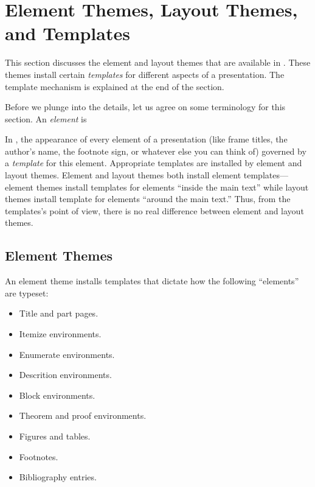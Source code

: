 
%


\section{Element Themes, Layout Themes, and Templates}

This section discusses the element and layout themes that are
available in \beamer. These themes install certain \emph{templates}
for different aspects of a presentation. The template mechanism is
explained at the end of the section.

Before we plunge into the details, let us agree on some terminology
for this section. An \emph{element} is 

In \beamer, the appearance of every element of a presentation (like
frame titles, the author's name, the footnote sign, or whatever else
you can think of) governed by a \emph{template} for this
element. Appropriate templates are installed by element and layout
themes. Element and layout themes both install element
templates---element themes install templates for elements
``inside the main text'' while layout themes install template for
elements ``around the main text.'' Thus, from the templates's point of
view, there is no real difference between element and layout themes.



\subsection{Element Themes}

An element theme installs templates that dictate how the following
``elements'' are typeset:
\begin{itemize}
\item Title and part pages.
\item Itemize environments.
\item Enumerate environments.
\item Descrition environments.
\item Block environments.
\item Theorem and proof environments.
\item Figures and tables.
\item Footnotes.
\item Bibliography entries.
\end{itemize}


